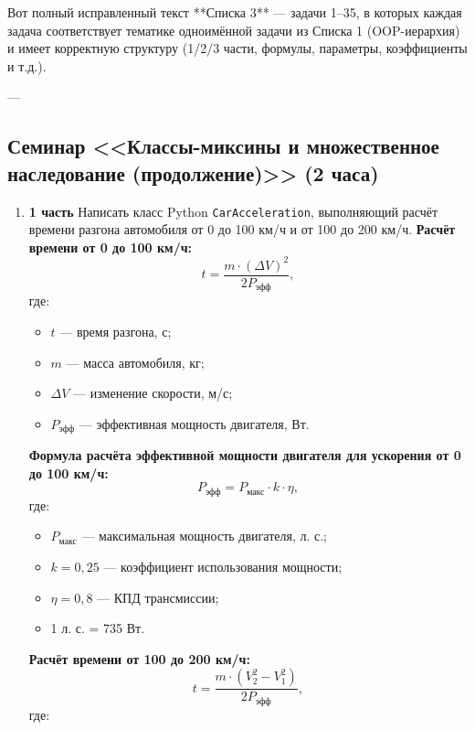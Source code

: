Вот полный исправленный текст **Списка 3** — задачи 1–35, в которых каждая задача соответствует тематике одноимённой задачи из Списка 1 (OOP-иерархия) и имеет корректную структуру (1/2/3 части, формулы, параметры, коэффициенты и т.д.).

---

\subsection{Семинар <<Классы-миксины и множественное наследование (продолжение)>> (2 часа)}
\begin{enumerate}
    \item[1] \textbf{1 часть}  
    Написать класс Python \texttt{CarAcceleration}, выполняющий расчёт времени разгона автомобиля от 0 до 100 км/ч и от 100 до 200 км/ч.  
    \textbf{Расчёт времени от 0 до 100 км/ч:}
    \begin{equation}
    t = \frac{m \cdot (\Delta V)^2}{2P_{\text{эфф}}},
    \end{equation}
    где:  
    \begin{itemize}
        \item $t$ — время разгона, с;  
        \item $m$ — масса автомобиля, кг;  
        \item $\Delta V$ — изменение скорости, м/с;  
        \item $P_{\text{эфф}}$ — эффективная мощность двигателя, Вт.  
    \end{itemize}
    \textbf{Формула расчёта эффективной мощности двигателя для ускорения от 0 до 100 км/ч:}
    \begin{equation}
    P_{\text{эфф}} = P_{\text{макс}} \cdot k \cdot \eta,
    \end{equation}
    где:  
    \begin{itemize}
        \item $P_{\text{макс}}$ — максимальная мощность двигателя, л. с.;  
        \item $k = 0{,}25$ — коэффициент использования мощности;  
        \item $\eta = 0{,}8$ — КПД трансмиссии;  
        \item 1 л. с. = 735 Вт.  
    \end{itemize}
    \textbf{Расчёт времени от 100 до 200 км/ч:}
    \begin{equation}
    t = \frac{m \cdot (V_2^2 - V_1^2)}{2P_{\text{эфф}}},
    \end{equation}
    где:  
    \begin{itemize}

\end{itemize}
\end{enumerate}
